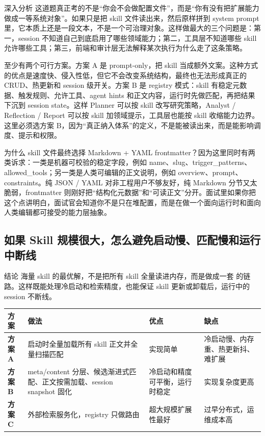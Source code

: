 \documentclass[12pt]{article}
\begin{document}
\begin{analysisBox}{深入分析}
这道题真正考的不是“你会不会做配置文件”，而是“你有没有把扩展能力做成一等系统对象”。如果只是把 skill 文件读出来，然后原样拼到 system prompt 里，它本质上还是一段文本，不是一个可治理对象。这样做最大的三个问题是：第一，session 不知道自己到底启用了哪些领域能力；第二，工具层不知道哪些 skill 允许哪些工具；第三，前端和审计层无法解释某次执行为什么走了这条策略。

至少有两个可行方案。方案 A 是 prompt-only，把 skill 当成额外文案。这种方式的优点是速度快、侵入性低，但它不会改变系统结构，最终也无法形成真正的 CRUD、热更新和 session 级开关。方案 B 是 registry 模式：skill 有稳定元数据、触发规则、允许工具、agent hints 和正文内容，运行时先做匹配，再把结果下沉到 session state。这样 Planner 可以按 skill 改写研究策略，Analyst / Reflection / Report 可以按 skill 加领域提示，工具层也能按 skill 收缩能力边界。这里必须选方案 B，因为“真正纳入体系”的定义，不是能被读出来，而是能影响调度、提示和权限。

为什么 skill 文件最终选择 Markdown + YAML frontmatter？因为这里同时有两类诉求：一类是机器可校验的稳定字段，例如 name、slug、trigger\_patterns、allowed\_tools；另一类是人类可编辑的正文说明，例如 overview、prompt、constraints。纯 JSON / YAML 对非工程用户不够友好，纯 Markdown 分节又太脆弱，frontmatter 则刚好把“结构化元数据”和“可读正文”分开。面试里如果你把这个点讲明白，面试官会知道你不是只在堆配置，而是在做一个面向运行时和面向人类编辑都可接受的能力层抽象。
\end{analysisBox}

\subsection{如果 Skill 规模很大，怎么避免启动慢、匹配慢和运行中断线}
\begin{qaBox}{结论}
海量 skill 的最优解，不是把所有 skill 全量读进内存，而是做成一套  的链路。这样既能处理冷启动和检索精度，也能保证 skill 更新或卸载后，运行中的 session 不断线。
\end{qaBox}

\begin{center}
\small
\begin{tabularx}{\textwidth}{>{\bfseries}lXXX}
\toprule
方案 & 做法 & 优点 & 缺点 \\
\midrule
方案 A & 启动时全量加载所有 skill 正文并全量扫描匹配 & 实现简单 & 冷启动慢、内存重、热更新抖、难扩展 \\
方案 B & meta/content 分层、候选渐进式匹配、正文按需加载、session snapshot 固化 & 冷启动和精度可平衡，运行时稳定 & 实现复杂度更高 \\
方案 C & 外部检索服务化，registry 只做路由 & 超大规模扩展性最好 & 过早分布式，运维成本高 \\
\bottomrule
\end{tabularx}
\end{center}
\end{document}
